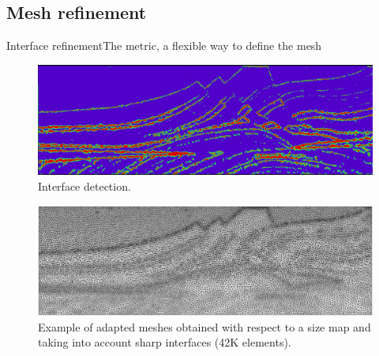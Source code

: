 \subsection{Mesh refinement}
\begin{frame}{Interface refinement}{The metric, a flexible way to define the mesh}
 \small

\begin{overprint}
      \begin{figure}[!htbp]
\centering
\includegraphics[scale=0.25]{image/grad_e.png}
\caption{Interface detection.}
\label{mesh_marmousi}
\end{figure}
\begin{figure}[!htbp]
\centering
\includegraphics[scale=0.27]{image/marmousi_mesh.png}
\caption{Example of adapted meshes obtained with respect to a size map and taking into account sharp interfaces (42K elements).}
\label{mesh_marmousi}
\end{figure}
    \end{overprint}
\end{frame}





